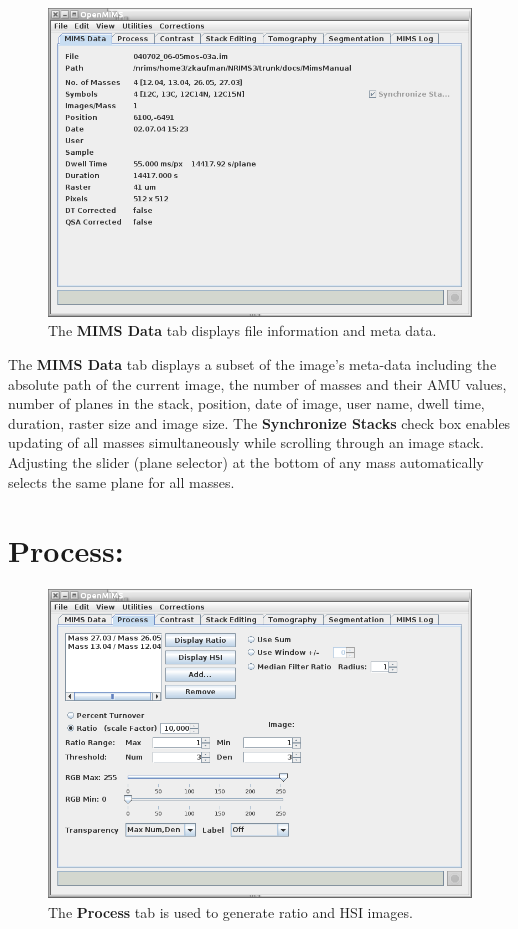 \documentclass{article}
\begin{document}
	\begin{figure}[h]
	\centering
	\includegraphics[scale=0.70]{snapshot_MimsData.png}
	\caption{The \textbf{MIMS Data} tab displays file information and meta data.}
	\end{figure}
	
	The \textbf{MIMS Data} tab displays a subset of the image's meta-data
	including the absolute path of the current image, the number of masses 
	and their AMU values, number of planes in the stack, position, date 
	of image, user name, dwell time, duration, raster size and image size. 
	The \textbf{Synchronize Stacks} check box enables updating of all masses 
	simultaneously while scrolling through an image stack. Adjusting the 
	slider (plane selector) at the bottom of any mass automatically selects 
	the same plane for all masses.


\newpage
\section*{Process:}
	
	\begin{figure}[h]
	\centering
	\includegraphics[scale=0.65]{snapshot_Process.png}
	\caption{The \textbf{Process} tab is used to generate ratio and HSI images.}
	\end{figure}
\end{document}
